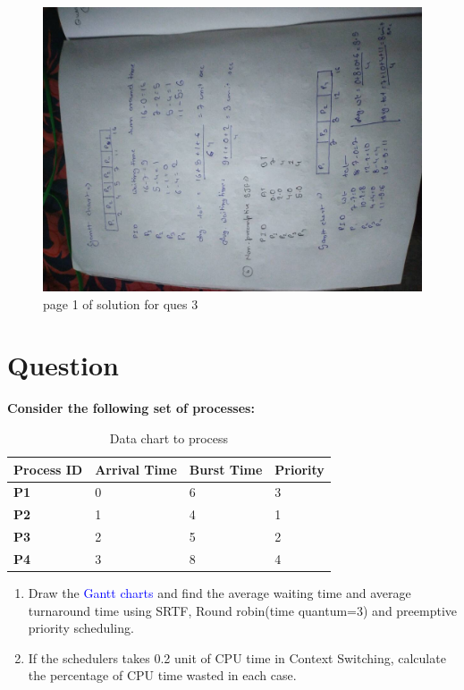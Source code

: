 \documentclass[11pt,a4paper,oneside]{article}
\begin{document}
\begin{figure}[hbt!]
	\centering
	\includegraphics[width=1\textwidth, angle=-90]{images/red_images/q3i1.jpg}
	\caption{page 1 of solution for ques 3}
\end{figure}

\clearpage

\section{Question}

\bgroup \bfseries
\noindent Consider the following set of processes:
\egroup{}

\begin{center}
	\begin{table}[h]
		\begin{tabular}{ ||>{\bfseries} m{7em} || m{7em} || m{7em} || m{7em} ||}
			\hline
			Process ID & \textbf{Arrival Time} & \textbf{Burst Time} & \textbf{Priority} \\
			\hline
			P1 & 0  & 6 & 3 \\
			\hline
			P2 & 1 & 4 & 1 \\
			\hline
			P3 & 2 & 5 & 2 \\
			\hline
			P4 & 3 & 8 & 4 \\
			\hline
		\end{tabular}
	\caption{Data chart to process}
	\end{table}
\end{center}

\bgroup \bfseries
\begin{enumerate}[label=(\roman*)]
		\item Draw the \textcolor{blue}{Gantt charts} and find the average waiting time and average turnaround time using SRTF, Round robin(time quantum=3) and preemptive priority scheduling.
		\item If the schedulers takes 0.2 unit of CPU time in Context Switching, calculate the percentage of CPU time wasted in each case.
\end{enumerate}
\egroup{}
\end{document}
